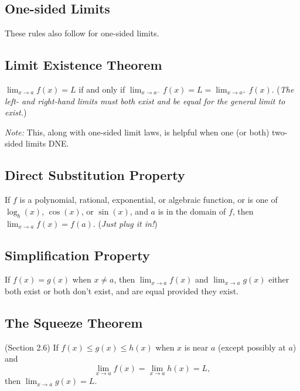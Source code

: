 \documentclass[11pt,reqno,final]{amsart}
\numberwithin{equation}{section}
\numberwithin{figure}{section}
\theoremstyle{definition} %
\begin{document}
$ $

\subsection*{One-sided Limits}
These rules also follow for one-sided limits.

\subsection*{Limit Existence Theorem}
$\displaystyle\lim_{x\to a}f(x)=L$ if and only if
$\displaystyle\lim_{x\to a^-}f(x)=L=\lim_{x\to a^+}f(x)$.
\quad ({\em The left- and right-hand limits must both
  exist and be equal for the general limit to exist.})

\textit{Note:} This, along with one-sided limit laws, is helpful when one (or both) two-sided limits DNE.

\subsection*{Direct Substitution Property}
If $f$ is a polynomial, rational, exponential, or algebraic function, or is one of $\log_b(x)$, $\cos(x)$, or $\sin(x)$,
and $a$ is in the domain of $f$, then $\displaystyle\lim_{x\to a}f(x)=f(a)$. \quad  ({\em Just plug it in!})

\subsection*{Simplification Property}
If $f(x)=g(x)$ when $x\neq a$, then
$\displaystyle \lim_{x\to a}f(x)$ and $\lim_{x\to a}g(x)$ either both exist or both don't exist,
and are equal provided they exist.

\subsection*{The Squeeze Theorem} (Section 2.6)
If $f(x)\leq g(x)\leq h(x)$ when $x$ is near $a$ (except possibly
at $a$) and
    \[
    \lim_{x\to a}f(x)=\lim_{x\to a}h(x)=L,
    \]
then $\displaystyle\lim_{x\to a}g(x)=L$.
\end{document}
